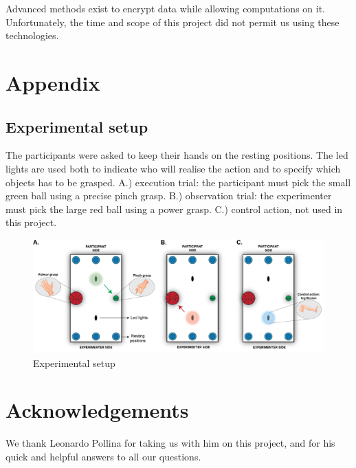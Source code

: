 \documentclass[10pt,conference,compsocconf]{IEEEtran}
\begin{document}
Advanced methods exist to encrypt data while allowing computations on it\cite{app11167360}. Unfortunately, the time and scope of this project did not permit us using these technologies.

\section{Appendix}
\subsection{Experimental setup}
The participants were asked to keep their hands on the resting positions. The led lights are used both to indicate who will realise the action and to specify which objects has to be grasped. A.) execution trial: the participant must pick the small green ball using a precise pinch grasp. B.) observation trial: the experimenter must pick the large red ball using a power grasp. C.) control action, not used in this project.

\begin{figure}[h!]
    \center
    \includegraphics[width=\linewidth]{images/2024-12-11-13-41-23.png}
    \caption{Experimental setup}
\end{figure}
\FloatBarrier




\section*{Acknowledgements}
We thank Leonardo Pollina for taking us with him on this project, and for his quick and helpful answers to all our questions.



\end{document}
